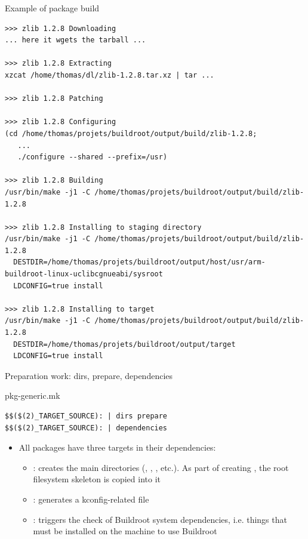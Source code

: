 \begin{frame}[fragile]{Example of package build}

\tiny
\begin{verbatim}
>>> zlib 1.2.8 Downloading
... here it wgets the tarball ...

>>> zlib 1.2.8 Extracting
xzcat /home/thomas/dl/zlib-1.2.8.tar.xz | tar ...

>>> zlib 1.2.8 Patching

>>> zlib 1.2.8 Configuring
(cd /home/thomas/projets/buildroot/output/build/zlib-1.2.8;
   ...
   ./configure --shared --prefix=/usr)

>>> zlib 1.2.8 Building
/usr/bin/make -j1 -C /home/thomas/projets/buildroot/output/build/zlib-1.2.8

>>> zlib 1.2.8 Installing to staging directory
/usr/bin/make -j1 -C /home/thomas/projets/buildroot/output/build/zlib-1.2.8
  DESTDIR=/home/thomas/projets/buildroot/output/host/usr/arm-buildroot-linux-uclibcgnueabi/sysroot
  LDCONFIG=true install

>>> zlib 1.2.8 Installing to target
/usr/bin/make -j1 -C /home/thomas/projets/buildroot/output/build/zlib-1.2.8
  DESTDIR=/home/thomas/projets/buildroot/output/target
  LDCONFIG=true install
\end{verbatim}
\end{frame}

\begin{frame}[fragile]{Preparation work: dirs, prepare, dependencies}

  \begin{block}{pkg-generic.mk}
    \begin{verbatim}
$$($(2)_TARGET_SOURCE): | dirs prepare
$$($(2)_TARGET_SOURCE): | dependencies
    \end{verbatim}
  \end{block}

  \begin{itemize}
  \item All packages have three targets in their dependencies:
    \begin{itemize}
    \item {}: creates the main directories (,
      , , etc.). As part of creating
      , the root filesystem skeleton is copied into
      it
    \item {}: generates a kconfig-related 
      file
    \item {}: triggers the check of Buildroot system
      dependencies, i.e. things that must be installed on the machine
      to use Buildroot
    \end{itemize}
  \end{itemize}
\end{frame}

